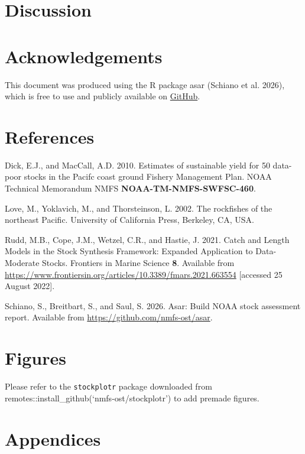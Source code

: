\documentclass[
  letterpaper,
]{article}
\newlength{\cslhangindent}
\newenvironment{CSLReferences}[2] %
 {\begin{list}{}{%
  \setlength{\itemindent}{0pt}
  \setlength{\leftmargin}{0pt}
  \setlength{\parsep}{0pt}
  \ifodd #1
   \setlength{\leftmargin}{\cslhangindent}
   \setlength{\itemindent}{-1\cslhangindent}
  \fi
  \setlength{\itemsep}{#2\baselineskip}}}
 {\end{list}}
\begin{document}
\newpage{}

\section{Discussion}\label{sec-discussion}

\newpage{}

\section{Acknowledgements}\label{sec-acknowledgements}

This document was produced using the R package asar (Schiano et al.
2026), which is free to use and publicly available on
\href{https://github.com/nmfs-ost/asar}{GitHub}.

\newpage{}

\section{References}\label{sec-refs}

\label{refs}
\begin{CSLReferences}{1}{0}
Dick, E.J., and MacCall, A.D. 2010. Estimates of sustainable yield for
50 data-poor stocks in the {Pacifc} coast ground {Fishery Management
Plan}. NOAA Technical Memorandum NMFS \textbf{NOAA-TM-NMFS-SWFSC-460}.

Love, M., Yoklavich, M., and Thorsteinson, L. 2002. {The rockfishes of
the northeast Pacific}. University of California Press, Berkeley, CA,
USA.

Rudd, M.B., Cope, J.M., Wetzel, C.R., and Hastie, J. 2021. Catch and
{Length Models} in the {Stock Synthesis Framework}: {Expanded
Application} to {Data-Moderate Stocks}. Frontiers in Marine Science
\textbf{8}. Available from
\url{https://www.frontiersin.org/articles/10.3389/fmars.2021.663554}
{[}accessed 25 August 2022{]}.

Schiano, S., Breitbart, S., and Saul, S. 2026. Asar: Build NOAA stock
assessment report. Available from
\url{https://github.com/nmfs-ost/asar}.

\end{CSLReferences}

\newpage{}

\clearpage

\newpage{}

\section{Figures}\label{sec-figures}

Please refer to the \texttt{stockplotr} package downloaded from
remotes::install\_github(`nmfs-ost/stockplotr') to add premade figures.

\newpage{}

\appendix
\setcounter{figure}{0}
\setcounter{table}{0}

\section{Appendices}\label{sec-appendix}
\end{document}
